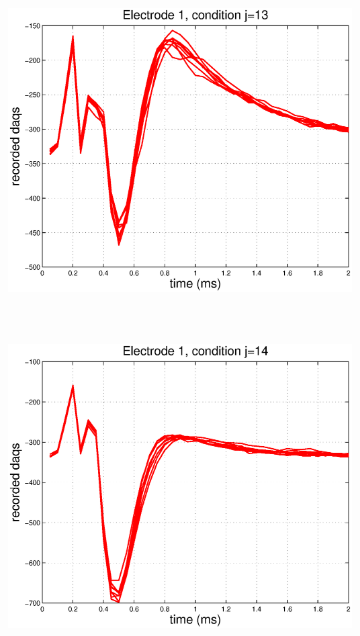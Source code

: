 \documentclass[12pt,letterpaper,fleqn]{article}
\begin{document}
\begin{figure}[ht!]
\begin{subfigure}[b]{0.23\textwidth}
                \includegraphics[width=\textwidth]{EL12.eps}
                \caption{}
        \end{subfigure}
        ~  \begin{subfigure}[b]{0.23\textwidth}
                \includegraphics[width=\textwidth]{EL13.eps}
                \caption{}
        \end{subfigure}
        \\
         \begin{subfigure}[b]{0.23\textwidth}

\end{subfigure}
\end{figure}
\end{document}
